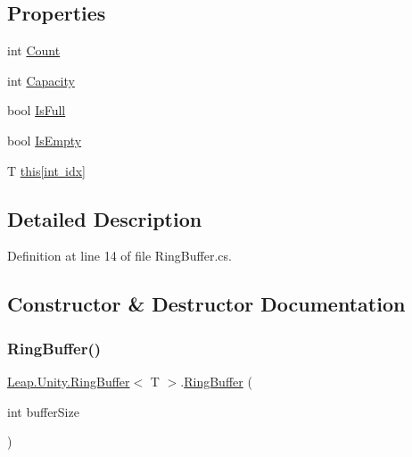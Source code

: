\subsection*{Properties}
\begin{DoxyCompactItemize}
\item 
int \mbox{\hyperlink{class_leap_1_1_unity_1_1_ring_buffer_a3361425f9bf601a6c7e0532c63e8b9e6}{Count}}
\item 
int \mbox{\hyperlink{class_leap_1_1_unity_1_1_ring_buffer_a0907fbd8b3b1949fde0c3976a1b34826}{Capacity}}
\item 
bool \mbox{\hyperlink{class_leap_1_1_unity_1_1_ring_buffer_a91a5cab77461964082498ba9a6455306}{Is\+Full}}
\item 
bool \mbox{\hyperlink{class_leap_1_1_unity_1_1_ring_buffer_a4ccf75588bc5ec7150108f22ee689ba3}{Is\+Empty}}
\item 
T \mbox{\hyperlink{class_leap_1_1_unity_1_1_ring_buffer_a78141075db5bb630c84bd9065939f235}{this\mbox{[}int idx\mbox{]}}}
\end{DoxyCompactItemize}


\subsection{Detailed Description}


Definition at line 14 of file Ring\+Buffer.\+cs.



\subsection{Constructor \& Destructor Documentation}
\mbox{\label{class_leap_1_1_unity_1_1_ring_buffer_a1c34a2abe28e3cb69969b2d54410df2e}} 
\subsubsection{\texorpdfstring{RingBuffer()}{RingBuffer()}}
{\footnotesize\ttfamily \mbox{\hyperlink{class_leap_1_1_unity_1_1_ring_buffer}{Leap.\+Unity.\+Ring\+Buffer}}$<$ T $>$.\mbox{\hyperlink{class_leap_1_1_unity_1_1_ring_buffer}{Ring\+Buffer}} (\begin{DoxyParamCaption}\item[{int}]{buffer\+Size }\end{DoxyParamCaption})}



